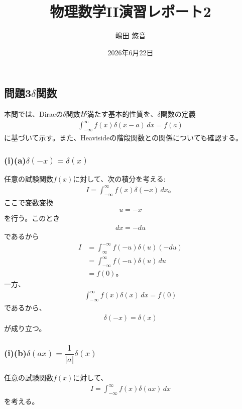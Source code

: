 \documentclass[platex、dvipdfmx、a4paper]{jsarticle}
\title{物理数学II演習レポート2}
\author{嶋田 悠音}
\date{2026年6月22日}
\begin{document}
  \maketitle
  \subsection*{問題3$\delta$関数}
  本問では、Diracの$\delta$関数が満たす基本的性質を、$\delta$関数の定義
  \begin{align*}
    \int_{-\infty}^{\infty} f(x)\delta(x-a)\,dx = f(a)
  \end{align*}
  に基づいて示す。また、Heavisideの階段関数との関係についても確認する。

  \subsubsection*{(i)(a)$\delta(-x)=\delta(x)$}
  任意の試験関数$f(x)$に対して、次の積分を考える:
  \begin{align*}
    I = \int_{-\infty}^{\infty} f(x)\delta(-x)\,dx。
  \end{align*}
  ここで変数変換
  \begin{align*}
    u=-x
  \end{align*}
  を行う。このとき
  \begin{align*}
    dx=-du
  \end{align*}
  であるから
  \begin{align*}
    I
    &= \int_{\infty}^{-\infty} f(-u)\delta(u)(-du) \\
    &= \int_{-\infty}^{\infty} f(-u)\delta(u)\,du \\
    &= f(0)。
  \end{align*}
  一方、
  \begin{align*}
    \int_{-\infty}^{\infty} f(x)\delta(x)\,dx = f(0)
  \end{align*}
  であるから、
  \begin{align*}
    \delta(-x)=\delta(x)
  \end{align*}
  が成り立つ。

  \subsubsection*{(i)(b)$\delta(ax)=\dfrac1{|a|}\delta(x)$}

  任意の試験関数$f(x)$に対して、
  \begin{align*}
    I = \int_{-\infty}^{\infty} f(x)\delta(ax)\,dx
  \end{align*}
  を考える。
\end{document}
